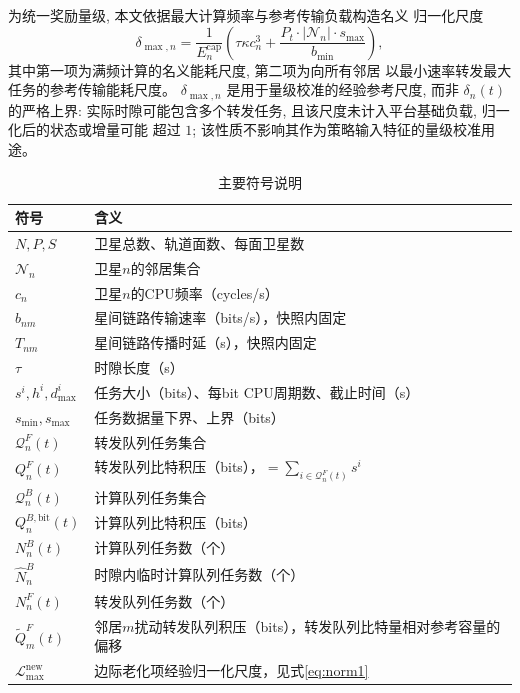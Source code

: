 \documentclass[a4paper,11pt]{article}
\begin{document}
为统一奖励量级, 本文依据最大计算频率与参考传输负载构造名义
归一化尺度
\begin{equation}
    \delta_{\max,n} = \frac{1}{E^{\mathrm{cap}}_n}\left(
    \tau \kappa c^3_n
    + \frac{P_t \cdot |\mathcal{N}_n| \cdot s_{\max}}{b_{\min}}
    \right),
    \label{eq:delta_max}
\end{equation}
其中第一项为满频计算的名义能耗尺度, 第二项为向所有邻居
以最小速率转发最大任务的参考传输能耗尺度。
$\delta_{\max,n}$ 是用于量级校准的经验参考尺度, 而非
$\delta_n(t)$ 的严格上界: 实际时隙可能包含多个转发任务,
且该尺度未计入平台基础负载, 归一化后的状态或增量可能
超过 $1$; 该性质不影响其作为策略输入特征的量级校准用途。

\begin{table}[t]
\centering
\caption{主要符号说明}
\label{tab:notation}
\begin{tabular}{ll}
\toprule
\textbf{符号} & \textbf{含义} \\
\midrule
$N, P, S$ & 卫星总数、轨道面数、每面卫星数 \\
$\mathcal{N}_n$ & 卫星$n$的邻居集合 \\
$c_n$ & 卫星$n$的CPU频率（cycles/s） \\
$b_{nm}$ & 星间链路传输速率（bits/s），快照内固定 \\
$T_{nm}$ & 星间链路传播时延（s），快照内固定 \\
$\tau$ & 时隙长度（s） \\
$s^i, h^i, d^i_{\max}$ & 任务大小（bits）、每bit CPU周期数、截止时间（s） \\
$s_{\min}, s_{\max}$ & 任务数据量下界、上界（bits） \\
$\mathcal{Q}^F_n(t)$ & 转发队列任务集合 \\
$Q^F_n(t)$ & 转发队列比特积压（bits），$=\sum_{i\in\mathcal{Q}^F_n(t)}s^i$ \\
$\mathcal{Q}^B_n(t)$ & 计算队列任务集合 \\
$Q^{B,\mathrm{bit}}_n(t)$ & 计算队列比特积压（bits） \\
$N^B_n(t)$ & 计算队列任务数（个） \\
$\hat{N}^B_n$ & 时隙内临时计算队列任务数（个） \\
$N^F_n(t)$ & 转发队列任务数（个） \\
$\tilde{Q}^F_m(t)$ & 邻居$m$扰动转发队列积压（bits），转发队列比特量相对参考容量的偏移 \\
$\mathcal{L}^{\mathrm{new}}_{\max}$ & 边际老化项经验归一化尺度，见式\eqref{eq:norm1} \\

\end{tabular}
\end{table}
\end{document}
